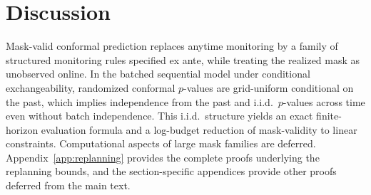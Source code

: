 \documentclass{uai2026} %
\newcommand{\1}{\mathbf{1}}
\begin{document}

\section{Discussion}
\label{sec:discussion}
Mask-valid conformal prediction replaces anytime monitoring by a family of structured monitoring rules specified ex ante, while treating the realized mask as unobserved online.
In the batched sequential model under conditional exchangeability, randomized conformal $p$-values are grid-uniform conditional on the past, which implies independence from the past and i.i.d.\ $p$-values across time even without batch independence.
This i.i.d.\ structure yields an exact finite-horizon evaluation formula and a log-budget reduction of mask-validity to linear constraints.
Computational aspects of large mask families are deferred.
Appendix~\ref{app:replanning} provides the complete proofs underlying the replanning bounds, and the section-specific appendices provide other proofs deferred from the main text.


\appendix
\onecolumn
\end{document}
